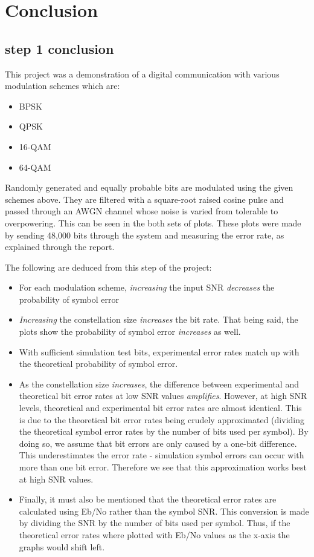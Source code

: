 \documentclass[]{article}
\begin{document}
\newpage

\section{Conclusion}
\subsection{step 1 conclusion}
This project was a demonstration of a digital communication with various modulation schemes which are:
\begin{itemize}
\item BPSK
\item QPSK
\item 16-QAM
\item 64-QAM
\end{itemize}

Randomly generated and equally probable bits are modulated using the given schemes above.  They are filtered with a square-root raised cosine pulse and passed through an AWGN channel whose noise is varied from tolerable to overpowering.  This can be seen in the both sets of plots.  These plots were made by sending 48,000 bits through the system and measuring the error rate, as explained through the report.

The following are deduced from this step of the project:
\begin{itemize}
\item For each modulation scheme, \emph{increasing} the input SNR \emph{decreases} the probability of symbol error
\item \emph{Increasing} the constellation size \emph{increases} the bit rate.  That being said, the plots show the probability of symbol error \emph{increases} as well.
\item With sufficient simulation test bits, experimental error rates match up with  the theoretical probability of symbol error. 
\item As the constellation size \emph{increases}, the difference between experimental and theoretical bit error rates at low SNR values \emph{amplifies}. However, at high SNR levels, theoretical and experimental bit error rates are almost identical. This is due to the theoretical bit error rates being crudely approximated (dividing the theoretical symbol error rates by the number of bits used per symbol). By doing so, we assume that bit errors are only caused by a one-bit difference.  This underestimates the error rate - simulation symbol errors can occur with more than one bit error. Therefore we see that this approximation works best at high SNR values. 
\item Finally, it must also be mentioned that the theoretical error rates are calculated using Eb/No rather than the symbol SNR. This conversion is made by dividing the SNR by the number of bits used per symbol. Thus, if the theoretical error rates where plotted with Eb/No values as the x-axis the graphs would shift left.  

\end{itemize}
\end{document}
